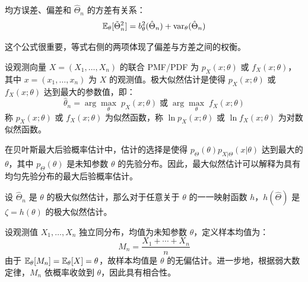 \begin{property}
均方误差、偏差和 $\hat\Theta_n$ 的方差有关系：
\[
\mathbb{E}_\theta[\tilde\Theta_n^2]=b_\theta^2(\hat\Theta_n)+\mathrm{var}_\theta(\hat\Theta_n)
\]
\end{property}
\begin{remark}
这个公式很重要，等式右侧的两项体现了偏差与方差之间的权衡。
\end{remark}

\begin{definition}
设观测向量 $X=(X_1,\ldots,X_n)$ 的联合 PMF/PDF 为 $p_X(x;\theta)$ 或 $f_X(x;\theta)$，其中 $x=(x_1,\ldots,x_n)$ 为 $X$ 的观测值。极大似然估计是使得 $p_X(x;\theta)$ 或 $f_X(x;\theta)$ 达到最大的参数值，即：
\[
\hat\theta_n=\arg\max_\theta\;p_X(x;\theta)\;\text{或}\;\arg\max_\theta\;f_X(x;\theta)
\]
称 $p_X(x;\theta)$ 或 $f_X(x;\theta)$ 为似然函数，称 $\ln p_X(x;\theta)$ 或 $\ln f_X(x;\theta)$ 为对数似然函数。
\end{definition}

\begin{remark}[极大似然估计与最大后验概率估计]
在贝叶斯最大后验概率估计中，估计的选择是使得 $p_\Theta(\theta)p_{X\vert\Theta}(x\vert\theta)$ 达到最大的 $\theta$，其中 $p_\Theta(\theta)$ 是未知参数 $\theta$ 的先验分布。因此，最大似然估计可以解释为具有均匀先验分布的最大后验概率估计。
\end{remark}

\begin{theorem}[极大似然估计的不变原理]
设 $\hat\Theta_n$ 是 $\theta$ 的极大似然估计，那么对于任意关于 $\theta$ 的一一映射函数 $h$，$h(\hat\Theta)$ 是 $\zeta=h(\theta)$ 的极大似然估计。
\end{theorem}

\begin{example}[随机变量均值的估计]
设观测值 $X_1,\ldots,X_n$ 独立同分布，均值为未知参数 $\theta$，定义样本均值为：
\[
M_n=\frac{X_1+\cdots+X_n}{n}
\]
由于 $\mathbb{E}_\theta[M_n]=\mathbb{E}_\theta[X]=\theta$，故样本均值是 $\theta$ 的无偏估计。进一步地，根据弱大数定律，$M_n$ 依概率收敛到 $\theta$，因此具有相合性。
\end{example}

